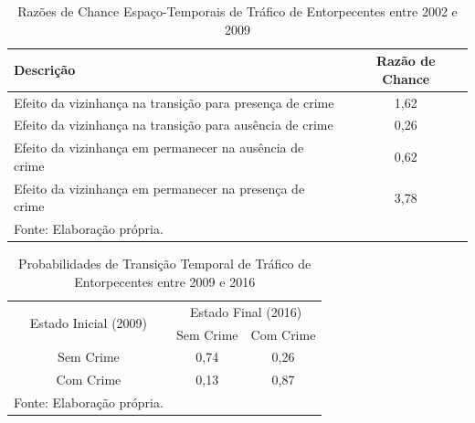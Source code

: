 \documentclass[12pt,openright,oneside,a4paper,english,french,spanish]{abntex2}
\numberwithin{table}{section} %
\numberwithin{figure}{section} %
\begin{document}
\begin{subappendices}
\begin{table}[H]
\centering
\caption{Razões de Chance Espaço-Temporais de Tráfico de Entorpecentes entre 2002 e 2009}
        \begin{tabular}{lc}
            \hline
            {\textbf{Descrição}} & {\textbf{Razão de Chance}} \\\hline
            {Efeito da vizinhança na transição para presença de crime} & {1,62} \\
            {Efeito da vizinhança na transição para ausência de crime} & {0,26} \\
            {Efeito da vizinhança em permanecer na ausência de crime} & {0,62} \\
            {Efeito da vizinhança em permanecer na presença de crime} & {3,78} \\\hline
            \tiny Fonte: Elaboração própria.
        \end{tabular}
    \label{tab:odds_espaco_tempo_trafico_2002_2009}
\end{table}













\begin{table}[H]
\centering
\caption{Probabilidades de Transição Temporal de Tráfico de Entorpecentes entre 2009 e 2016}
        \begin{tabular}{ccc}
            \hline
            \multirow{2}{*}{Estado Inicial (2009)} & \multicolumn{2}{c}{Estado Final (2016)}  \\\cline{2-3} 
                                     & \multicolumn{1}{l}{Sem Crime} & \multicolumn{1}{l}{Com Crime} \\\hline
            {Sem Crime} & {0,74} & {0,26} \\                \hline
            {Com Crime} & {0,13} & {0,87} \\                \hline
            \tiny Fonte: Elaboração própria.
        \end{tabular}
    \label{tab:prob_tempo_trafico_2009_2016}
\end{table}


\end{subappendices}
\end{document}
